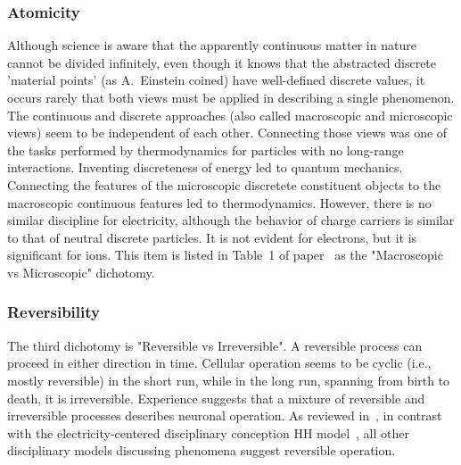 \subsubsection{Atomicity\label{sec:Physics-Atomicity}}

Although science is aware that the apparently continuous matter in nature cannot be divided infinitely, even though it knows that the abstracted discrete
'material points' (as A.~Einstein coined) have well-defined discrete values,
it occurs rarely that both views must be applied in describing a single
phenomenon. The continuous and discrete approaches (also called macroscopic and microscopic views) seem to be independent of each other.
Connecting those views was one of the tasks performed by thermodynamics for particles with no long-range interactions. Inventing discreteness of energy led to quantum mechanics.
Connecting the features of the microscopic discretete constituent objects  
to the macroscopic continuous features led to thermodynamics.
However, there is no similar discipline for electricity,
although the behavior of charge carriers is similar to that of neutral discrete 
particles. It is not evident for electrons, but it is significant for ions.
This item is listed in Table~1 of paper~\cite{ThermodynamicAPDrukarch:2022}
as the "Macroscopic vs Microscopic" dichotomy.

\subsubsection{Reversibility\label{sec:Physics-Reversibility}}
The third dichotomy is "Reversible vs Irreversible".
A reversible process can proceed in either direction in time.
Cellular operation seems to be cyclic (i.e., mostly reversible)
in the short run, while in the long run, spanning from birth to death, 
it is irreversible. 
Experience suggests that a mixture of reversible
and irreversible processes describes neuronal operation. 
As reviewed in~\cite{ThermodynamicAPDrukarch:2022}, in contrast with the electricity-centered disciplinary
conception \gls{HH} model~\cite{HodgkinHuxley:1952}, all other disciplinary models discussing phenomena suggest reversible operation.

